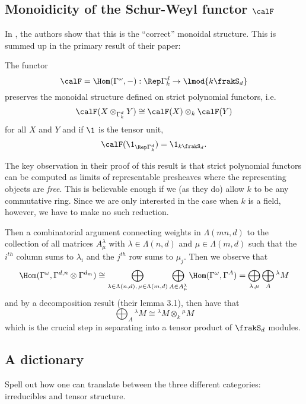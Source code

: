 \documentclass[12pt]{article}
\begin{document}
\subsection{Monoidicity of the Schur-Weyl functor \texorpdfstring{$\calF$}{F}}
In \cite{aquilino-reischuk}, the authors show that this is the ``correct'' monoidal structure. This is summed up 
in the primary result of their paper:
\begin{thm}
	The functor 
	\[\calF=\Hom(\Gamma^\omega,-):\Rep\Gamma^d_k\to \lmod{k\frakS_d}\]
	preserves the monoidal structure defined on strict polynomial functors, i.e.
	\[\calF(X\otimes_{\Gamma_k^d}Y)\cong\calF(X)\otimes_k\calF(Y)\]
	for all $X$ and $Y$ and if $\1$ is the tensor unit, 
	\[\calF(\1_{\Rep\Gamma^d_k})=\1_{k\frakS_d}.\]
\end{thm}

The key observation in their proof of this result is that strict polynomial functors can be computed 
as limits of representable presheaves where the representing objects are \textit{free}. This is believable enough 
if we (as they do) allow $k$ to be any commutative ring. Since we are only interested in the case when $k$ is a field, however,
we have to make no such reduction.

Then a combinatorial argument connecting weights in $\Lambda(mn,d)$ to the collection of all matrices $A^\lambda_\mu$ with $\lambda\in\Lambda(n,d)$ and $\mu\in\Lambda(m,d)$ such that the $i^{th}$ column sums to $\lambda_i$ and the 
$j^{th}$ row sums to $\mu_j$. Then we observe that
\[\Hom(\Gamma^\omega,\Gamma^{d,n}\otimes\Gamma^{d_m})\cong\bigoplus_{\lambda\in\Lambda(n,d),\,\mu\in\Lambda(m,d)}\bigoplus_{A\in A^\lambda_\mu}\Hom(\Gamma^\omega,\Gamma^A)=\bigoplus_{\lambda,\mu}\bigoplus_A{^\lambda M}\]
and by a decomposition result (their lemma 3.1), then have that 
\[\bigoplus_A {^\lambda M}\cong{^\lambda M}\otimes_k{^\mu M}\]
which is the crucial step in separating into a tensor product of $\frakS_d$ modules.

\subsection{A dictionary}
{\color{red} Spell out how one can translate between the three different categories: irreducibles and tensor structure.}

\newpage
\end{document}
